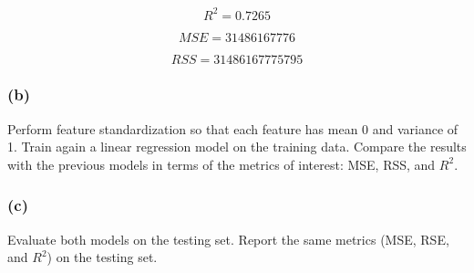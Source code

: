 \documentclass[11pt]{article}
\begin{document}
    $$R^2 = 0.7265$$

    
    $$MSE=31486167776$$

    
    $$RSS=31486167775795$$

    
    \subsubsection{(b)}\label{b}

Perform feature standardization so that each feature has mean 0 and
variance of 1. Train again a linear regression model on the training
data. Compare the results with the previous models in terms of the
metrics of interest: MSE, RSS, and \(R^2\).

\subsubsection{(c)}\label{c}

Evaluate both models on the testing set. Report the same metrics (MSE,
RSE, and \(R^2\)) on the testing set.
\end{document}
